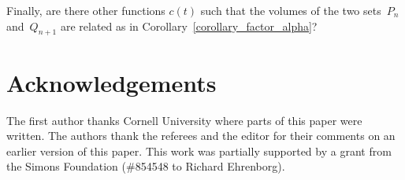 \documentclass[11pt,reqno]{amsart}
\theoremstyle{definition}
\numberwithin{equation}{section}
\begin{document}
Finally, are there other functions $c(t)$ such that
the volumes of the two sets~$P_{n}$ and~$Q_{n+1}$ are
related as in Corollary~\ref{corollary_factor_alpha}?


\section*{Acknowledgements}

The first author thanks Cornell University where parts of this paper were written. 
The authors thank the referees and the editor for their comments
on an earlier version of this paper.
This work was partially supported by a grant from the
Simons Foundation (\#854548 to Richard Ehrenborg).


             



\newcommand{\journal}[6]{{\sc #1,} #2, {\it #3} {\bf #4} (#5), #6.}
\newcommand{\book}[4]{{\sc #1,} ``#2,'' #3, #4.}
\newcommand{\thesis}[4]{{\sc #1,} ``#2,'' Doctoral dissertation, #3, #4.}
\newcommand{\springer}[4]{{\sc #1,} ``#2,'' Lecture Notes in Math.,
                     Vol.\ #3, Springer-Verlag, Berlin, #4.}
\newcommand{\preprint}[3]{{\sc #1,} #2, preprint #3.}
\newcommand{\preparation}[2]{{\sc #1,} #2, in preparation.}
\newcommand{\appear}[3]{{\sc #1,} #2, to appear in {\it #3}}
\newcommand{\submitted}[4]{{\sc #1,} #2, submitted to {\it #3}, #4.}
\newcommand{\JCTA}{J.\ Combin.\ Theory Ser.\ A}
\newcommand{\AdvancesinMathematics}{Adv.\ Math.}
\newcommand{\AdvancesinAppliedMathematics}{Adv.\ in Appl.\ Math.}
\newcommand{\JournalofAlgebraicCombinatorics}{J.\ Algebraic Combin.}
\end{document}

